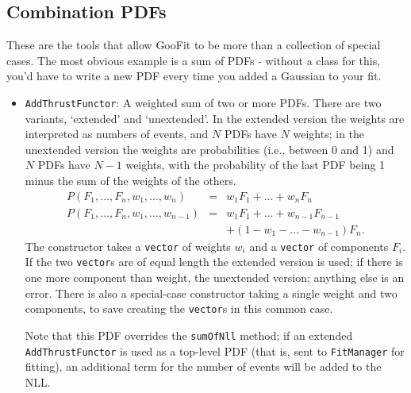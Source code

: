 \documentclass[12pt,pdflatex]{article}
\begin{document}
\subsection{Combination PDFs}

These are the tools that allow GooFit to be more than a collection
of special cases. The most obvious example is a sum of PDFs - without
a class for this, you'd have to write a new PDF every time you added a Gaussian
to your fit. 

\begin{itemize}
\item \texttt{AddThrustFunctor}: A weighted sum of two or more PDFs. There are two variants,
`extended' and `unextended'. In the extended version the weights are interpreted as numbers
of events, and $N$ PDFs have $N$ weights; in the unextended version the weights are probabilities
(i.e., between 0 and 1) and $N$ PDFs have $N-1$ weights, with the probability of the last PDF
being 1 minus the sum of the weights of the others. 
\begin{eqnarray}
P(F_1,\ldots, F_n,w_1,\ldots,w_n) &=& w_1F_1 + \ldots + w_nF_n \\
P(F_1,\ldots, F_n,w_1,\ldots,w_{n-1}) &=& 
w_1F_1 + \ldots + w_{n-1}F_{n-1}\\
&&+ (1 - w_1 - \ldots - w_{n-1})F_n.
\end{eqnarray}
The constructor takes a \texttt{vector} of weights $w_i$ and a \texttt{vector}
of components $F_i$. If the two \texttt{vector}s are of equal length the extended
version is used; if there is one more component than weight, the unextended version;
anything else is an error. There is also a special-case constructor taking a single
weight and two components, to save creating the \texttt{vector}s in this common case.

Note that this PDF overrides the \texttt{sumOfNll} method; if an extended \texttt{AddThrustFunctor}
is used as a top-level PDF (that is, sent to \texttt{FitManager} for fitting), an additional
term for the number of events will be added to the NLL.


\end{itemize}
\end{document}
